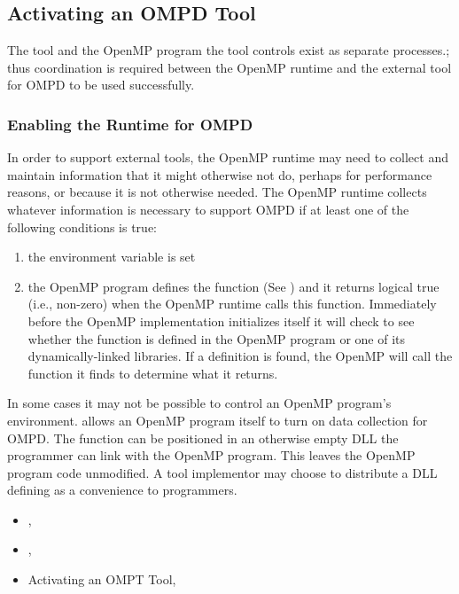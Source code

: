 \subsection{Activating an OMPD Tool}
\label{ompd:activating}

The tool and the OpenMP program the tool controls
exist as separate processes.; thus coordination is required between the OpenMP runtime
and the external tool for OMPD to be used successfully.

\subsubsection{Enabling the Runtime for OMPD}
\label{ompd:enabling-ompd}

In order to support external tools, the OpenMP runtime may need to collect
and maintain information that it might otherwise not do, perhaps
for performance reasons, or because it is not otherwise needed.
The OpenMP runtime collects whatever information is necessary
to support OMPD if at least one of the following conditions is true:
\begin{enumerate}
\item
  the environment variable  is set
\item
  the OpenMP program defines the function
  (See )
  and it returns logical true (i.e., non-zero) when
  the OpenMP runtime calls this function.
  Immediately before the OpenMP implementation initializes itself
  it will check to see whether the  function
  is defined in the OpenMP program or one of its dynamically-linked libraries.
  If a definition is found, the OpenMP will call the function it finds to determine what it returns.
\end{enumerate}
In some cases it may not be possible to control an OpenMP program's
environment.
 allows an OpenMP program itself to turn on
data collection for OMPD.
The function can be positioned in an otherwise empty DLL the
programmer can link with the OpenMP program.
This leaves the OpenMP program code unmodified.
A tool implementor may choose to distribute a DLL defining
 as a convenience to programmers.

\crossreferences
\begin{itemize}
\item
  , 
\item
  , 
\item
  Activating an OMPT Tool, 
\end{itemize}

